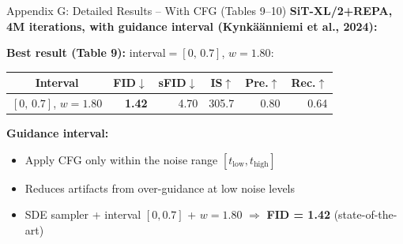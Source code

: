 \documentclass[aspectratio=169, 10pt]{beamer}
\begin{document}
\begin{frame}{Appendix G: Detailed Results -- With CFG (Tables 9--10)}
\small
\textbf{SiT-XL/2+REPA, 4M iterations, with guidance interval (Kynk\"{a}\"{a}nniemi et al., 2024):}

\vspace{0.4em}
\textbf{Best result (Table 9):} interval$=[0,\,0.7]$, $w=1.80$:
\begin{center}
\begin{tabular}{crrrrr}
\toprule
\textbf{Interval} & \textbf{FID$\downarrow$} & \textbf{sFID$\downarrow$} & \textbf{IS$\uparrow$} & \textbf{Pre.$\uparrow$} & \textbf{Rec.$\uparrow$} \\
\midrule
$[0,\,0.7]$, $w=1.80$ & \textbf{1.42} & 4.70 & 305.7 & 0.80 & 0.64 \\
\bottomrule
\end{tabular}
\end{center}

\vspace{0.5em}
\textbf{Guidance interval:}
\begin{itemize}\setlength{\itemsep}{2pt}
  \item Apply CFG only within the noise range $[t_{\text{low}}, t_{\text{high}}]$
  \item Reduces artifacts from over-guidance at low noise levels
  \item SDE sampler + interval $[0, 0.7]$ + $w=1.80$ $\Rightarrow$ \textbf{FID = 1.42} (state-of-the-art)
\end{itemize}
\end{frame}
\end{document}
